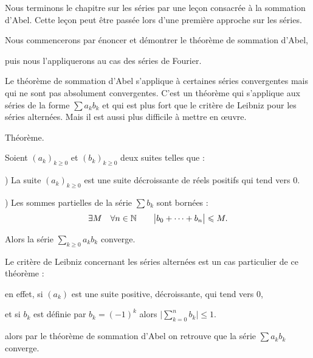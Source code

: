 






\debuttexte


\diapo

Nous terminons le chapitre sur les séries par une leçon consacrée à la sommation d'Abel. 
Cette leçon peut être passée lors d'une première approche sur les séries.

\change
\change
Nous commencerons par énoncer et démontrer le théorème de sommation d'Abel,

\change
puis nous l'appliquerons au cas des séries de Fourier.

\diapo

Le théorème de sommation d'Abel s'applique à certaines séries
convergentes mais qui ne sont pas absolument convergentes.
C'est un théorème qui s'applique aux séries de la forme $\sum a_kb_k$
et qui est plus fort que le critère de Leibniz pour les séries alternées. Mais il est aussi plus difficile à mettre en \oe uvre.

\change
Théorème.

Soient $(a_k)_{k\ge0}$ et $(b_k)_{k\ge0}$ deux suites telles que :

) La suite $(a_k)_{k\ge0}$ est une suite décroissante de
réels positifs qui tend vers $0$.

) Les sommes partielles de la série $\sum b_k$ sont bornées :
$$\exists M\quad\forall n\in \mathbb{N}\qquad
\big|b_0+\cdots+b_n\big|\leqslant M.$$

\change
Alors la série $\sum_{k\ge0} a_kb_k$ converge.


\diapo
Le critère de Leibniz concernant les séries alternées est un cas particulier de ce théorème :

\change
en effet, si $(a_k)$ est une suite positive, décroissante, qui tend vers $0$, 

\change
et si $b_k$ est définie par $b_k=(-1)^k$ alors $\big|\sum_{k=0}^n b_k\big|\le 1$.


\change
alors par le théorème de sommation d'Abel on retrouve que la série $\sum a_k b_k$ converge.

\diapo

